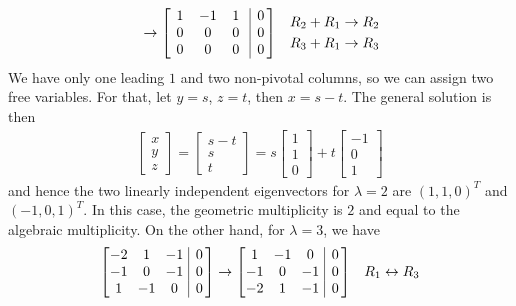 \begin{solution}
\begin{align*}
&\to
\left[\begin{array}{@{\,}wc{10pt}wc{10pt}wc{10pt}|c@{\,}}
1 & -1 & 1 & 0 \\
0 & 0 & 0 & 0 \\
0 & 0 & 0 & 0
\end{array}\right] & \begin{aligned}
R_2 + R_1 &\to R_2 \\
R_3 + R_1 &\to R_3 \\
\end{aligned}
\end{align*}
We have only one leading $1$ and two non-pivotal columns, so we can assign two free variables. For that, let $y = s$, $z = t$, then $x = s - t$. The general solution is then
\begin{align*}
\begin{bmatrix}
x \\
y \\ 
z
\end{bmatrix}
=
\begin{bmatrix}
s - t \\
s \\ 
t
\end{bmatrix}
=
s
\begin{bmatrix}
1 \\
1 \\
0
\end{bmatrix}
+ t 
\begin{bmatrix}
-1 \\
0 \\
1
\end{bmatrix}
\end{align*}
and hence the two linearly independent eigenvectors for $\lambda = 2$ are $(1,1,0)^T$ and $(-1,0,1)^T$. In this case, the geometric multiplicity is $2$ and equal to the algebraic multiplicity. On the other hand, for $\lambda = 3$, we have
\begin{align*}
\left[\begin{array}{@{\,}wc{10pt}wc{10pt}wc{10pt}|c@{\,}}
-2 & 1 & -1 & 0 \\
-1 & 0 & -1 & 0 \\
1 & -1 & 0 & 0
\end{array}\right] 
&\to    
\left[\begin{array}{@{\,}wc{10pt}wc{10pt}wc{10pt}|c@{\,}}
1 & -1 & 0 & 0 \\
-1 & 0 & -1 & 0 \\
-2 & 1 & -1 & 0 
\end{array}\right] & R_1 \leftrightarrow R_3 \\

\end{align*}
\end{solution}
